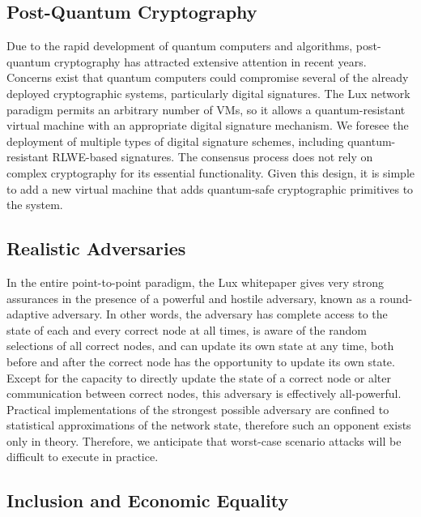 \documentclass[11pt]{article}
\begin{document}
\subsection{Post-Quantum Cryptography}

Due to the rapid development of quantum computers and algorithms, post-quantum cryptography has attracted extensive attention in recent years. Concerns exist that quantum computers could compromise several of the already deployed cryptographic systems, particularly digital signatures. The Lux network paradigm permits an arbitrary number of VMs, so it allows a quantum-resistant virtual machine with an appropriate digital signature mechanism. We foresee the deployment of multiple types of digital signature schemes, including quantum-resistant RLWE-based signatures. The consensus process does not rely on complex cryptography for its essential functionality. Given this design, it is simple to add a new virtual machine that adds quantum-safe cryptographic primitives to the system.


\subsection{Realistic Adversaries}

In the entire point-to-point paradigm, the Lux whitepaper gives very strong assurances in the presence of a powerful and hostile adversary, known as a round-adaptive adversary. In other words, the adversary has complete access to the state of each and every correct node at all times, is aware of the random selections of all correct nodes, and can update its own state at any time, both before and after the correct node has the opportunity to update its own state. Except for the capacity to directly update the state of a correct node or alter communication between correct nodes, this adversary is effectively all-powerful. Practical implementations of the strongest possible adversary are confined to statistical approximations of the network state, therefore such an opponent exists only in theory. Therefore, we anticipate that worst-case scenario attacks will be difficult to execute in practice.


\subsection{Inclusion and Economic Equality}
\end{document}
